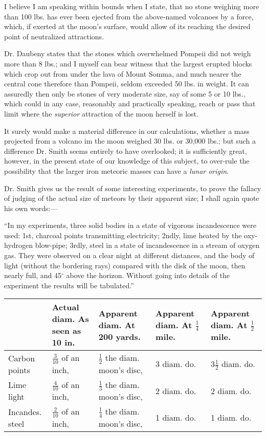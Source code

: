 \documentclass[a4paper, 12pt, oneside]{article}
\begin{document}
I believe I am speaking within bounds when I state, that no stone weighing more than 100 lbs. has ever been ejected from the above-named volcanoes by a force, which, if exerted at the moon's surface, would allow of its reaching the desired point of neutralized attractions.

Dr. Daubeny states that the stones which overwhelmed Pompeii did not weigh more than 8 lbs.; and I myself can bear witness that the largest erupted blocks which crop out from under the lava of Mount Somma, and much nearer the central cone therefore than Pompeii, seldom exceeded 50 lbs. in weight. It can assuredly then only be stones of very moderate size, say of some 5 or 10 lbs., which could in any case, reasonably and practically speaking, reach or pass that limit where the \emph{superior} attraction of the moon herself is lost.

It surely would make a material difference in our calculations, whether a mass projected from a volcano im the moon weighed 30 lbs. or 30,000 lbs.; but such a difference Dr. Smith seems entirely to have overlooked; it is sufficiently great, however, in the present state of our knowledge of this subject, to over-rule the possibility that the larger iron meteoric masses can have a \emph{lunar origin}.

Dr. Smith gives us the result of some interesting experiments, to prove the fallacy of judging of the actual size of meteors by their apparent size; I shall again quote his own words:---

``In my experiments, three solid bodies in a state of vigorous incandescence were used: 1st, charcoal points transmitting electricity; 2ndly, lime heated by the oxy-hydrogen blow-pipe; 3rdly, steel in a state of incandescence in a stream of oxygen gas. They were observed on a clear night at different distances, and the body of light (without the bordering rays) compared with the disk of the moon, then nearly full, and 45$^\circ$ above the horizon. Without going into details of the experiment the results will be tabulated.''
\begin{table}[H]
    \footnotesize
    \centering
    \begin{tabular}{l p{20mm} p{20mm} p{20mm} p{20mm}}
         ~ & Actual diam. As seen as 10 in. & Apparent diam. At 200 yards. & Apparent diam. At $\frac{1}{4}$ mile. & Apparent diam. At $\frac{1}{2}$ mile. \\ \hline
        Carbon points & $\frac{3}{10}$ of an inch, & $\frac{1}{2}$ the diam. moon’s disc, & 3 diam. do. & $3\frac{1}{2}$ diam. do. \\ 
        Lime light & $\frac{4}{10}$ of an inch, & $\frac{1}{3}$ the diam. moon’s disc, & 2 diam. do. & 2 diam. do. \\ 
        Incandes. steel & $\frac{2}{10}$ of an inch, & $\frac{1}{4}$ the diam. moon’s disc, & 1 diam. do. & 1 diam. do. \\
    \end{tabular}
\end{table}
\end{document}
